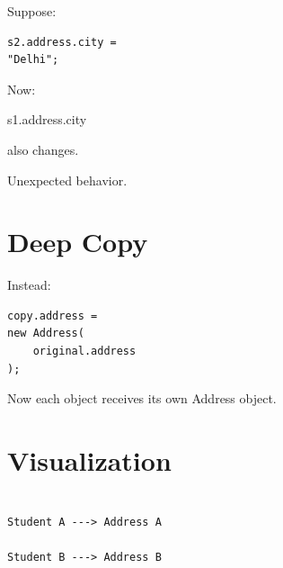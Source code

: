 \documentclass[11pt,a4paper]{book}
\begin{document}
Suppose:

\begin{verbatim}
s2.address.city =
"Delhi";
\end{verbatim}


Now:


s1.address.city


also changes.


Unexpected behavior.


\section{Deep Copy}

Instead:

\begin{verbatim}
copy.address =
new Address(
    original.address
);
\end{verbatim}


Now each object receives its
own Address object.


\section{Visualization}

\begin{verbatim}

Student A ---> Address A

Student B ---> Address B

\end{verbatim}

\end{document}
